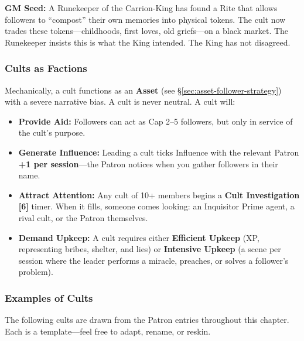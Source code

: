\textbf{GM Seed:} A Runekeeper of the Carrion-King has found a Rite that allows followers to ``compost'' their own memories into physical tokens. The cult now trades these tokens---childhoods, first loves, old griefs---on a black market. The Runekeeper insists this is what the King intended. The King has not disagreed.

\subsubsection*{Cults as Factions}

Mechanically, a cult functions as an \textbf{Asset} (see \S\ref{sec:asset-follower-strategy}) with a severe narrative bias. A cult is never neutral. A cult will:
\begin{itemize}
  \item \textbf{Provide Aid:} Followers can act as Cap 2--5 followers, but only in service of the cult's purpose.
  \item \textbf{Generate Influence:} Leading a cult ticks Influence with the relevant Patron \textbf{+1 per session}---the Patron notices when you gather followers in their name.
  \item \textbf{Attract Attention:} Any cult of 10+ members begins a \textbf{Cult Investigation [6]} timer. When it fills, someone comes looking: an Inquisitor Prime agent, a rival cult, or the Patron themselves.
  \item \textbf{Demand Upkeep:} A cult requires either \textbf{Efficient Upkeep} (XP, representing bribes, shelter, and lies) or \textbf{Intensive Upkeep} (a scene per session where the leader performs a miracle, preaches, or solves a follower's problem).
\end{itemize}

\subsubsection*{Examples of Cults}

The following cults are drawn from the Patron entries throughout this chapter. Each is a template---feel free to adapt, rename, or reskin.

